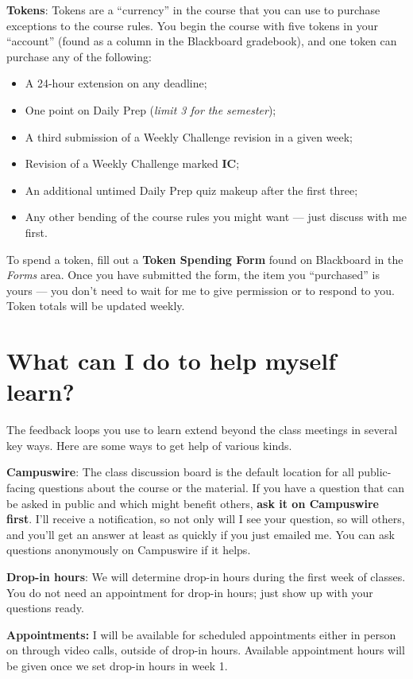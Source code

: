 \documentclass[]{article}
\providecommand{\tightlist}{%
  \setlength{\itemsep}{0pt}\setlength{\parskip}{0pt}}
\begin{document}
\textbf{Tokens}: Tokens are a ``currency'' in the course that you can use to purchase exceptions to the course rules. You begin the course with five tokens in your ``account'' (found as a column in the Blackboard gradebook), and one token can purchase any of the following:
\begin{itemize}
\tightlist
    \item A 24-hour extension on any deadline; 
    \item One point on Daily Prep (\textit{limit 3 for the semester});
    \item A third submission of a Weekly Challenge revision in a given week;
    \item Revision of a Weekly Challenge marked \textbf{IC}; 
    \item An additional untimed Daily Prep quiz makeup after the first three; 
    \item Any other bending of the course rules you might want --- just discuss with me first. 
\end{itemize}
To spend a token, fill out a \textbf{Token Spending Form} found on Blackboard in the \textit{Forms} area. Once you have submitted the form, the item you ``purchased'' is yours --- you don't need to wait for me to give permission or to respond to you. Token totals will be updated weekly. 


\section{What can I do to help myself learn?}

The feedback loops you use to learn extend beyond the class meetings in several key ways. Here are some ways to get help of various kinds. 


\textbf{Campuswire}: The class discussion board is the default location for all public-facing questions about the course or the material. If you have a question that can be asked in public and which might benefit others, \textbf{ask it on Campuswire first}. I'll receive a notification, so not only will I see your question, so will others, and you'll get an answer at least as quickly if you just emailed me. You can ask questions anonymously on Campuswire if it helps. 

\textbf{Drop-in hours}: We will determine drop-in hours during the first week of classes. You do not need an appointment for drop-in hours; just show up with your questions ready. 

\textbf{Appointments:} I will be available for scheduled appointments either in person on through video calls, outside of drop-in hours. Available appointment hours will be given once we set drop-in hours in week 1. 
\end{document}
